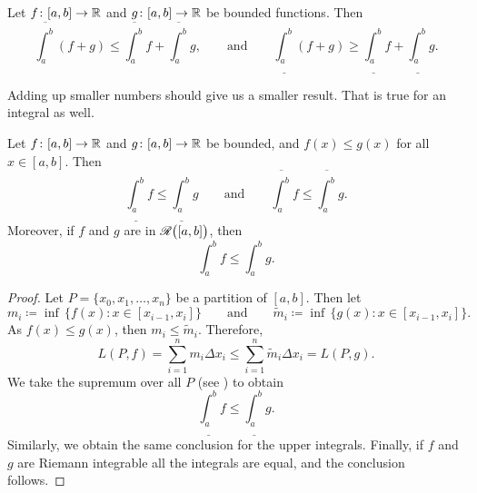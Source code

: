 \begin{prop} \label{prop:upperlowerlinineq}
Let $f \colon [a,b] \to {\mathbb{R}}$ and $g \colon [a,b] \to {\mathbb{R}}$ be bounded
functions.  Then
\begin{equation*}
\overline{\int_a^b} (f+g) \leq \overline{\int_a^b}f+\overline{\int_a^b}g
,
\qquad
\text{and}
\qquad
\underline{\int_a^b} (f+g) \geq \underline{\int_a^b}f+\underline{\int_a^b}g
.
\end{equation*}
\end{prop}

Adding up smaller numbers should give us a smaller result.
That is true for an integral as well.

\begin{prop}[Monotonicity]
Let $f \colon [a,b] \to {\mathbb{R}}$ and $g \colon [a,b] \to {\mathbb{R}}$ be
bounded, and $f(x) \leq g(x)$
for all $x \in [a,b]$.  Then
\begin{equation*}
\underline{\int_a^b} f 
\leq
\underline{\int_a^b} g 
\qquad \text{and} \qquad
\overline{\int_a^b} f 
\leq
\overline{\int_a^b} g .
\end{equation*}
Moreover, if $f$ and $g$ are in ${\mathscr{R}}\bigl([a,b]\bigr)$, then
\begin{equation*}
\int_a^b f 
\leq
\int_a^b g .
\end{equation*}
\end{prop}

\begin{proof}
Let $P = \{ x_0, x_1, \ldots, x_n \}$ be a partition of $[a,b]$.  Then
let
\begin{equation*}
m_i \coloneqq \inf \, \bigl\{ f(x) : x \in [x_{i-1},x_i] \bigr\}
\qquad \text{and} \qquad
\widetilde{m}_i \coloneqq \inf \, \bigl\{ g(x) : x \in [x_{i-1},x_i] \bigr\} .
\end{equation*}
As $f(x) \leq g(x)$, then $m_i \leq \widetilde{m}_i$.
Therefore,
\begin{equation*}
L(P,f)
=
\sum_{i=1}^n m_i \Delta x_i
\leq
\sum_{i=1}^n \widetilde{m}_i \Delta x_i
=
L(P,g) .
\end{equation*}
We take the supremum over all $P$ (see ) to obtain 
\begin{equation*}
\underline{\int_a^b} f 
\leq
\underline{\int_a^b} g .
\end{equation*}
Similarly, we obtain the same conclusion for the upper integrals.
Finally,
if $f$ and $g$ are Riemann integrable all the integrals are equal,
and the conclusion follows.
\end{proof}


